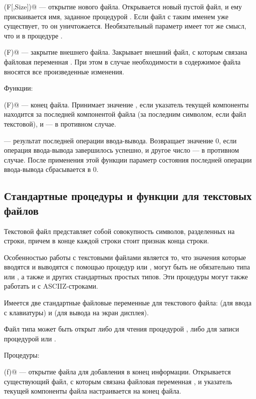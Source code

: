 \documentclass[12pt,a4paper]{article}
\theoremstyle{plain}
\theoremstyle{definition}
\theoremstyle{remark}
\begin{document}
\verb@Rewrite(F[,Size])@ --- открытие нового файла. Открывается новый пустой файл, и ему присваивается имя, заданное процедурой \verb@Assign@. Если файл с таким именем уже существует, то он уничтожается. Необязательный параметр \verb@Size@ имеет тот же смысл, что и в процедуре \verb@Reset@.

\verb@Close(F)@ --- закрытие внешнего файла. Закрывает внешний файл, с которым связана файловая переменная \verb@F@. При этом в случае необходимости в содержимое файла вносятся все произведенные изменения.

Функции:

\verb@Eof(F)@ --- конец файла. Принимает значение \verb@true@, если указатель текущей компоненты находится за последней компонентой файла (за последним символом, если файл текстовой), и \verb@false@ --- в противном случае.

\verb@IOResult@ --- результат последней операции ввода-вывода. Возвращает значение 0, если операция ввода-вывода завершилось успешно, и другое число --- в противном случае. После применения этой функции параметр состояния последней операции ввода-вывода сбрасывается в 0. 

\subsection{Стандартные процедуры и функции для текстовых файлов}

Текстовой файл представляет собой совокупность символов, разделенных на строки, причем в конце каждой строки стоит признак конца строки.

Особенностью работы с текстовыми файлами является то, что значения которые вводятся и выводятся с помощью процедур \verb@read@ или \verb@write@, могут быть не обязательно типа \verb@Char@ или \verb@String@, а также и других стандартных простых типов. Эти процедуры могут также работать и с ASCIIZ-строками.

Имеется две стандартные файловые переменные для текстового файла: \verb@input@ (для ввода с клавиатуры) и \verb@output@ (для вывода на экран дисплея).

Файл типа \verb@Text@ может быть открыт либо для чтения процедурой \verb@reset@, либо для записи процедурой \verb@rewrite@ или \verb@append@.

Процедуры:

\verb@Append(f)@ --- открытие файла для добавления в конец информации. Открывается существующий файл, с которым связана файловая переменная \verb@F@, и указатель текущей компоненты файла настраивается на конец файла.
\end{document}
